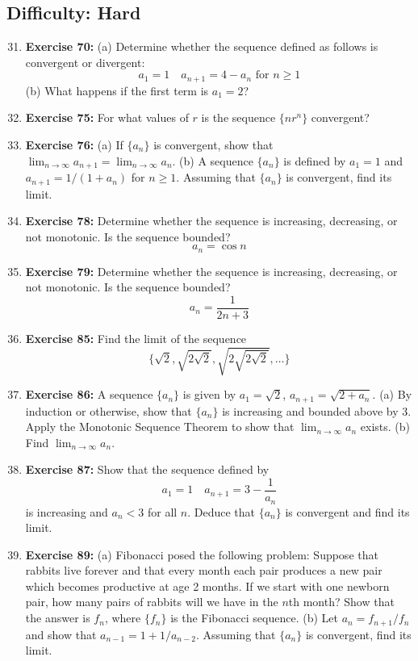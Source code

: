 \documentclass[12pt, a4paper]{article}
\begin{document}
\subsection*{Difficulty: Hard}
\begin{enumerate}
    \setcounter{enumi}{30}
    \item \textbf{Exercise 70:} (a) Determine whether the sequence defined as follows is convergent or divergent:
    \[ a_1 = 1 \quad a_{n+1} = 4 - a_n \text{ for } n \ge 1 \]
    (b) What happens if the first term is $a_1 = 2$?

    \item \textbf{Exercise 75:} For what values of $r$ is the sequence $\{nr^n\}$ convergent?

    \item \textbf{Exercise 76:} (a) If $\{a_n\}$ is convergent, show that $\lim_{n \to \infty} a_{n+1} = \lim_{n \to \infty} a_n$.
    (b) A sequence $\{a_n\}$ is defined by $a_1 = 1$ and $a_{n+1} = 1/(1+a_n)$ for $n \ge 1$. Assuming that $\{a_n\}$ is convergent, find its limit.

    \item \textbf{Exercise 78:} Determine whether the sequence is increasing, decreasing, or not monotonic. Is the sequence bounded?
    \[ a_n = \cos n \]

    \item \textbf{Exercise 79:} Determine whether the sequence is increasing, decreasing, or not monotonic. Is the sequence bounded?
    \[ a_n = \frac{1}{2n+3} \]

    \item \textbf{Exercise 85:} Find the limit of the sequence
    \[ \{ \sqrt{2}, \sqrt{2\sqrt{2}}, \sqrt{2\sqrt{2\sqrt{2}}}, \dots \} \]
    
    \item \textbf{Exercise 86:} A sequence $\{a_n\}$ is given by $a_1 = \sqrt{2}$, $a_{n+1} = \sqrt{2 + a_n}$.
    (a) By induction or otherwise, show that $\{a_n\}$ is increasing and bounded above by 3. Apply the Monotonic Sequence Theorem to show that $\lim_{n \to \infty} a_n$ exists.
    (b) Find $\lim_{n \to \infty} a_n$.

    \item \textbf{Exercise 87:} Show that the sequence defined by
    \[ a_1 = 1 \quad a_{n+1} = 3 - \frac{1}{a_n} \]
    is increasing and $a_n < 3$ for all $n$. Deduce that $\{a_n\}$ is convergent and find its limit.
    
    \item \textbf{Exercise 89:} (a) Fibonacci posed the following problem: Suppose that rabbits live forever and that every month each pair produces a new pair which becomes productive at age 2 months. If we start with one newborn pair, how many pairs of rabbits will we have in the $n$th month? Show that the answer is $f_n$, where $\{f_n\}$ is the Fibonacci sequence.
    (b) Let $a_n = f_{n+1}/f_n$ and show that $a_{n-1} = 1 + 1/a_{n-2}$. Assuming that $\{a_n\}$ is convergent, find its limit.


\end{enumerate}
\end{document}
